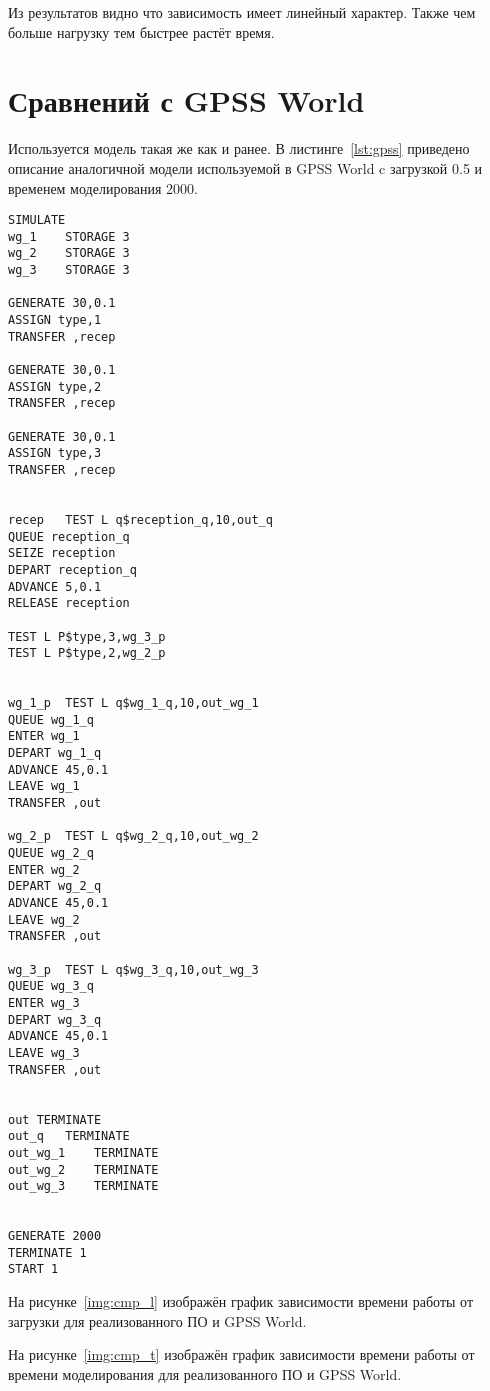 Из результатов видно что зависимость имеет линейный характер. Также чем больше нагрузку тем быстрее растёт время.

\section{Сравнений с GPSS World}

Используется модель такая же как и ранее. В листинге~\ref{lst:gpss} приведено описание аналогичной модели используемой в GPSS World c загрузкой 0.5 и временем моделирования 2000.

\begin{center}
	\captionsetup{justification=raggedright,singlelinecheck=off}
	\begin{lstlisting}[label=lst:gpss,caption=Модель GPSS World,showstringspaces=false]
SIMULATE
wg_1	STORAGE 3
wg_2	STORAGE 3
wg_3	STORAGE 3

GENERATE 30,0.1
ASSIGN type,1
TRANSFER ,recep

GENERATE 30,0.1
ASSIGN type,2
TRANSFER ,recep

GENERATE 30,0.1
ASSIGN type,3
TRANSFER ,recep


recep	TEST L q$reception_q,10,out_q
QUEUE reception_q
SEIZE reception
DEPART reception_q
ADVANCE 5,0.1
RELEASE reception

TEST L P$type,3,wg_3_p
TEST L P$type,2,wg_2_p


wg_1_p	TEST L q$wg_1_q,10,out_wg_1
QUEUE wg_1_q
ENTER wg_1
DEPART wg_1_q
ADVANCE 45,0.1
LEAVE wg_1
TRANSFER ,out

wg_2_p	TEST L q$wg_2_q,10,out_wg_2
QUEUE wg_2_q
ENTER wg_2
DEPART wg_2_q
ADVANCE 45,0.1
LEAVE wg_2
TRANSFER ,out

wg_3_p	TEST L q$wg_3_q,10,out_wg_3
QUEUE wg_3_q
ENTER wg_3
DEPART wg_3_q
ADVANCE 45,0.1
LEAVE wg_3
TRANSFER ,out


out	TERMINATE
out_q	TERMINATE
out_wg_1	TERMINATE
out_wg_2	TERMINATE
out_wg_3	TERMINATE


GENERATE 2000
TERMINATE 1
START 1
	\end{lstlisting}
\end{center}
\FloatBarrier

На рисунке~\ref{img:cmp_l} изображён график зависимости времени работы от загрузки для реализованного ПО и GPSS World.

\FloatBarrier

На рисунке~\ref{img:cmp_t} изображён график зависимости времени работы от времени моделирования для реализованного ПО и GPSS World.

